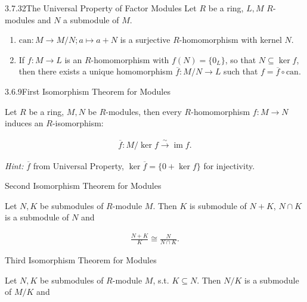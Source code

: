 \documentclass[10pt]{article} %
\DeclareMathOperator{\im}{im}
\newcommand{\Hint}{\vspace{0.2em}\textit{Hint: }}
\begin{document}
\begin{multicols}{3}
\begin{theorem}{3.7.32}{The Universal Property of Factor Modules}
    Let $R$ be a ring, $L,M$ $R$-modules and $N$ a submodule of $M$.

        \begin{enumerate}[(1)]
            \setlength{\parskip}{0em}
            \item $\mathrm{can}: M \to M/N; a \mapsto a + N$ is a surjective $R$-homomorphism with kernel $N$.%
            \item If $f: M \to L$ is an $R$-homomorphism with $f(N) = \{0_L\}$, so that $N \subseteq \ker{f}$, then there exists a unique homomorphism $\overline{f}: M/N \to L$ such that $f = \overline{f} \circ \mathrm{can}$.
        \end{enumerate}

\end{theorem}

\begin{theorem}{3.6.9}{First Isomorphism Theorem for Modules}

    Let $R$ be a ring, $M,N$ be $R$-modules, then every $R$-homomorphism $f: M \to N$ induces an $R$-isomorphism:

        \begin{align*}
            \overline{f}: M/\ker{f} \xrightarrow{\sim} \im{f}.
        \end{align*}

    \Hint $\overline{f}$ from Universal Property, $\ker{\overline{f}} = \{0 + \ker{f}\}$ for injectivity.

\end{theorem}

\begin{exercise}{59}{Second Isomorphism Theorem for Modules}

    Let $N,K$ be submodules of $R$-module $M$. Then $K$ is submodule of $N + K$, $N \cap K$ is a submodule of $N$ and

        \begin{align*}
            \frac{N+K}{K} \cong \frac{N}{N \cap K}.
        \end{align*}

\end{exercise}

\begin{exercise}{60}{Third Isomorphism Theorem for Modules}

    Let $N,K$ be submodules of $R$-module $M$, s.t. $K \subseteq N$. Then $N/K$ is a submodule of $M/K$ and


\end{exercise}
\end{multicols}
\end{document}
